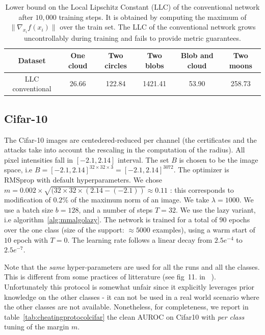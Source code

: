 \begin{table}%
    \centering
    \begin{tabular}{|c|ccccc|}
        \hline
       Dataset          & One cloud  & Two circles & Two blobs & Blob and cloud & Two moons \\
       \hline
       LLC conventional &   26.66    &    122.84   &  1421.41  &      53.90     &   258.73  \\ 
       \hline
    \end{tabular}
    \caption{Lower bound on the Local Lipschitz Constant (LLC) of the conventional network after $10,000$ training steps. It is obtained by computing the maximum of $\|\nabla_{x_i}f(x_i)\|$ over the train set. The LLC of the conventional network grows uncontrollably during training and fails to provide metric guarantees.}
    \label{tab:llc}
\end{table}

\subsection{Cifar-10}

The Cifar-10 images are centedered-reduced per channel (the certificates and the attacks take into account the rescaling in the computation of the radius). All pixel intensities fall in $[-2.1,2.14]$ interval. The set $B$ is chosen to be the image space, i.e $B=[-2.1,2.14]^{32\times 32\times 3}=[-2.1, 2.14]^{3072}$. The optimizer is RMSprop with default hyperparameters. We chose $m=0.002\times \sqrt{(32\times 32\times (2.14-(-2.1))}\approx 0.11$ : this corresponds to modification of $0.2$\% of the maximum norm of an image. We take $\lambda=1000$. We use a batch size $b=128$, and a number of steps $T=32$. We use the lazy variant, i.e algorithm~\ref{alg:mmalgolazy}. The network is trained for a total of $90$ epochs over the one class (size of the support: $\approx 5000$ examples), using a warm start of $10$ epoch with $T=0$. The learning rate follows a linear decay from $2.5e^{-4}$ to $2.5e^{-7}$.  

Note that the \textit{same} hyper-parameters are used for all the runs and all the classes. This is different from some practices of litterature (see fig~11. in~\cite{goyal_drocc_2020} ). Unfortunately this protocol is somewhat unfair since it explicitly leverages prior knowledge on the other classes - it can not be used in a real world scenario where the other classes are not available. Nonetheless, for completeness, we report in table~\ref{tab:cheatingprotocolcifar} the clean AUROC on Cifar10 with \textit{per class} tuning of the margin $m$.

